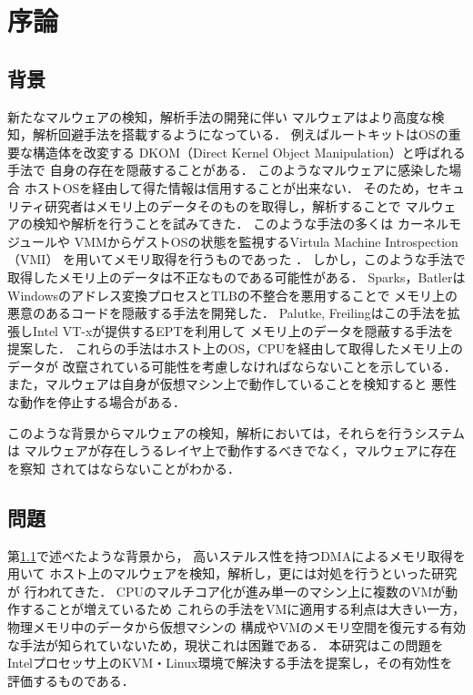 \chapter{序論}
\label{chap:introduction}

\section{背景}
\label{sec:background}

新たなマルウェアの検知，解析手法の開発に伴い
マルウェアはより高度な検知，解析回避手法を搭載するようになっている．
例えばルートキットはOSの重要な構造体を改変する
DKOM（Direct Kernel Object Manipulation）\cite{dkom}と呼ばれる手法で
自身の存在を隠蔽することがある\cite{florio}．
このようなマルウェアに感染した場合
ホストOSを経由して得た情報は信用することが出来ない．
そのため，セキュリティ研究者はメモリ上のデータそのものを取得し，解析することで
マルウェアの検知や解析を行うことを試みてきた．
このような手法の多くは
カーネルモジュールや
VMMからゲストOSの状態を監視するVirtula Machine Introspection（VMI）
を用いてメモリ取得を行うものであった\cite{lime} \cite{vmwatcher}．
しかし，このような手法で取得したメモリ上のデータは不正なものである可能性がある．
Sparks，BatlerはWindowsのアドレス変換プロセスとTLBの不整合を悪用することで
メモリ上の悪意のあるコードを隠蔽する手法を開発した\cite{shadowwalker}．
Palutke, Freilingはこの手法を拡張しIntel VT-xが提供するEPTを利用して
メモリ上のデータを隠蔽する手法を提案した\cite{styx}．
これらの手法はホスト上のOS，CPUを経由して取得したメモリ上のデータが
改竄されている可能性を考慮しなければならないことを示している．
また，マルウェアは自身が仮想マシン上で動作していることを検知すると
悪性な動作を停止する場合がある\cite{linuxmalware}．

このような背景からマルウェアの検知，解析においては，それらを行うシステムは
マルウェアが存在しうるレイヤ上で動作するべきでなく，マルウェアに存在を察知
されてはならないことがわかる．

\section{問題}

第\ref{sec:background}で述べたような背景から，
高いステルス性を持つDMAによるメモリ取得を用いて
ホスト上のマルウェアを検知，解析し，更には対処を行うといった研究が
行われてきた\cite{firewire}\cite{hardware_based_memory_acquistion}\cite{amoeba}\cite{anti_forensic_resilient_memory_acquisition}\cite{lo-phi}．
CPUのマルチコア化が進み単一のマシン上に複数のVMが動作することが増えているため
これらの手法をVMに適用する利点は大きい一方，物理メモリ中のデータから仮想マシンの
構成やVMのメモリ空間を復元する有効な手法が知られていないため，現状これは困難である．
本研究はこの問題をIntelプロセッサ上のKVM・Linux環境で解決する手法を提案し，その有効性を
評価するものである．

